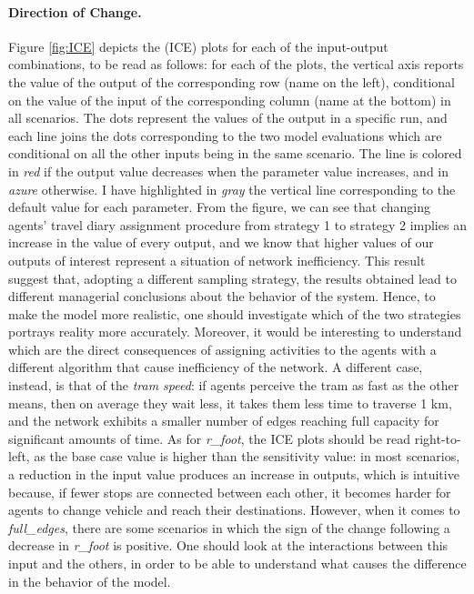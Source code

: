 \paragraph{Direction of Change.}
Figure \ref{fig:ICE} depicts the (ICE) plots for each of the input-output combinations, to be read as follows: for each of the plots, the vertical axis reports the value of the output of the corresponding row (name on the left), conditional on the value of the input of the corresponding column (name at the bottom) in all scenarios. The dots represent the values of the output in a specific run, and each line joins the dots corresponding to the two model evaluations which are conditional on all the other inputs being in the same scenario. The line is colored in \textit{red} if the output value decreases when the parameter value increases, and in \textit{azure} otherwise. I have highlighted in \textit{gray} the vertical line corresponding to the default value for each parameter. From the figure, we can see that changing agents' travel diary assignment procedure from strategy 1 to strategy 2 implies an increase in the value of every output, and we know that higher values of our outputs of interest represent a situation of network inefficiency. This result suggest that, adopting a different sampling strategy, the results obtained lead to different managerial conclusions about the behavior of the system. Hence, to make the model more realistic, one should investigate which of the two strategies portrays reality more accurately. Moreover, it would be interesting to understand which are the direct consequences of assigning activities to the agents with a different algorithm that cause inefficiency of the network. A different case, instead, is that of the \textit{tram speed}: if agents perceive the tram as fast as the other means, then on average they wait less, it takes them less time to traverse 1 km, and the network exhibits a smaller number of edges reaching full capacity for significant amounts of time. As for \textit{r\_foot}, the ICE plots should be read right-to-left, as the base case value is higher than the sensitivity value: in most scenarios, a reduction in the input value produces an increase in outputs, which is intuitive because, if fewer stops are connected between each other, it becomes harder for agents to change vehicle and reach their destinations. However, when it comes to \textit{full\_edges}, there are some scenarios in which the sign of the change following a decrease in \textit{r\_foot} is positive. One should look at the interactions between this input and the others, in order to be able to understand what causes the difference in the behavior of the model.



